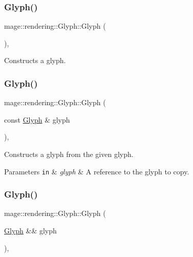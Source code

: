 \subsubsection{\texorpdfstring{Glyph()}{Glyph()}\hspace{0.1cm}{\footnotesize\ttfamily [1/3]}}
{\footnotesize\ttfamily mage\+::rendering\+::\+Glyph\+::\+Glyph (\begin{DoxyParamCaption}{ }\end{DoxyParamCaption})\hspace{0.3cm}{\ttfamily [default]}, {\ttfamily [noexcept]}}

Constructs a glyph. \hypertarget{structmage_1_1rendering_1_1_glyph_a97d90fe10ed59c2d594d0c194e072e7a}{}\label{structmage_1_1rendering_1_1_glyph_a97d90fe10ed59c2d594d0c194e072e7a} 
\subsubsection{\texorpdfstring{Glyph()}{Glyph()}\hspace{0.1cm}{\footnotesize\ttfamily [2/3]}}
{\footnotesize\ttfamily mage\+::rendering\+::\+Glyph\+::\+Glyph (\begin{DoxyParamCaption}\item[{const \hyperlink{structmage_1_1rendering_1_1_glyph}{Glyph} \&}]{glyph }\end{DoxyParamCaption})\hspace{0.3cm}{\ttfamily [default]}, {\ttfamily [noexcept]}}

Constructs a glyph from the given glyph.


\begin{DoxyParams}[1]{Parameters}
\mbox{\tt in}  & {\em glyph} & A reference to the glyph to copy. \\
\hline
\end{DoxyParams}
\hypertarget{structmage_1_1rendering_1_1_glyph_afc4ecea45f0a261964420195ef1f99ac}{}\label{structmage_1_1rendering_1_1_glyph_afc4ecea45f0a261964420195ef1f99ac} 
\subsubsection{\texorpdfstring{Glyph()}{Glyph()}\hspace{0.1cm}{\footnotesize\ttfamily [3/3]}}
{\footnotesize\ttfamily mage\+::rendering\+::\+Glyph\+::\+Glyph (\begin{DoxyParamCaption}\item[{\hyperlink{structmage_1_1rendering_1_1_glyph}{Glyph} \&\&}]{glyph }\end{DoxyParamCaption})\hspace{0.3cm}{\ttfamily [default]}, {\ttfamily [noexcept]}}


